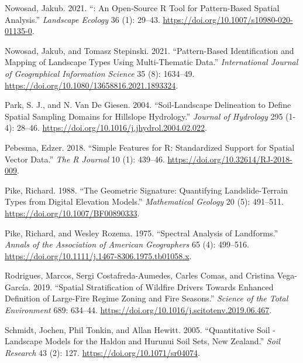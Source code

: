 \begin{CSLReferences}{1}{0}
\leavevmode{}%
Nowosad, Jakub. 2021. {``: An Open-Source {R} Tool for Pattern-Based Spatial Analysis.''} \emph{Landscape Ecology} 36 (1): 29--43. \url{https://doi.org/10.1007/s10980-020-01135-0}.

\leavevmode{}%
Nowosad, Jakub, and Tomasz Stepinski. 2021. {``Pattern-Based Identification and Mapping of Landscape Types Using Multi-Thematic Data.''} \emph{International Journal of Geographical Information Science} 35 (8): 1634--49. \url{https://doi.org/10.1080/13658816.2021.1893324}.

\leavevmode{}%
Park, S. J., and N. Van De Giesen. 2004. {``Soil-Landscape Delineation to Define Spatial Sampling Domains for Hillslope Hydrology.''} \emph{Journal of Hydrology} 295 (1-4): 28--46. \url{https://doi.org/10.1016/j.jhydrol.2004.02.022}.

\leavevmode{}%
Pebesma, Edzer. 2018. {``Simple Features for {R}: Standardized Support for Spatial Vector Data.''} \emph{The R Journal} 10 (1): 439--46. \url{https://doi.org/10.32614/RJ-2018-009}.

\leavevmode{}%
Pike, Richard. 1988. {``The Geometric Signature: Quantifying Landslide-Terrain Types from Digital Elevation Models.''} \emph{Mathematical Geology} 20 (5): 491--511. \url{https://doi.org/10.1007/BF00890333}.

\leavevmode{}%
Pike, Richard, and Wesley Rozema. 1975. {``Spectral Analysis of Landforms.''} \emph{Annals of the Association of American Geographers} 65 (4): 499--516. \url{https://doi.org/10.1111/j.1467-8306.1975.tb01058.x}.

\leavevmode{}%
Rodrigues, Marcos, Sergi Costafreda-Aumedes, Carles Comas, and Cristina Vega-García. 2019. {``Spatial Stratification of Wildfire Drivers Towards Enhanced Definition of Large-Fire Regime Zoning and Fire Seasons.''} \emph{Science of the Total Environment} 689: 634--44. \url{https://doi.org/10.1016/j.scitotenv.2019.06.467}.

\leavevmode{}%
Schmidt, Jochen, Phil Tonkin, and Allan Hewitt. 2005. {``Quantitative Soil - Landscape Models for the {H}aldon and {H}urunui Soil Sets, {N}ew {Z}ealand.''} \emph{Soil Research} 43 (2): 127. \url{https://doi.org/10.1071/sr04074}.


\end{CSLReferences}
